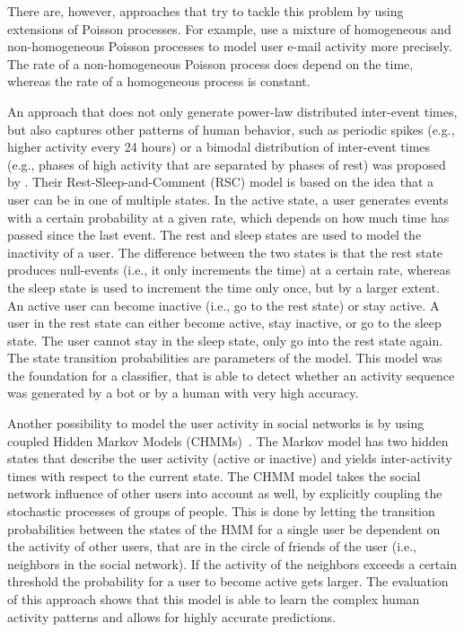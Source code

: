 There are, however, approaches that try to tackle this problem by using extensions of Poisson processes.
For example, \citet{Malmgren2008} use a mixture of homogeneous and non-homogeneous Poisson processes to model user e-mail activity more precisely.
The rate of a non-homogeneous Poisson process does depend on the time, whereas the rate of a homogeneous process is constant.

An approach that does not only generate power-law distributed inter-event times, but also captures other patterns of human behavior, such as periodic spikes (e.g., higher activity every 24 hours) or a bimodal distribution of inter-event times (e.g., phases of high activity that are separated by phases of rest) was proposed by \citet{Costa2015}.
Their Rest-Sleep-and-Comment (RSC) model is based on the idea that a user can be in one of multiple states.
In the active state, a user generates events with a certain probability at a given rate, which depends on how much time has passed since the last event.
The rest and sleep states are used to model the inactivity of a user.
The difference between the two states is that the rest state produces null-events (i.e., it only increments the time) at a certain rate, whereas the sleep state is used to increment the time only once, but by a larger extent.
An active user can become inactive (i.e., go to the rest state) or stay active.
A user in the rest state can either become active, stay inactive, or go to the sleep state.
The user cannot stay in the sleep state, only go into the rest state again.
The state transition probabilities are parameters of the model.
This model was the foundation for a classifier, that is able to detect whether an activity sequence was generated by a bot or by a human with very high accuracy.

Another possibility to model the user activity in social networks is by using coupled Hidden Markov Models (CHMMs)~\cite{Raghavan2013}.
The Markov model has two hidden states that describe the user activity (active or inactive) and yields inter-activity times with respect to the current state.
The CHMM model takes the social network influence of other users into account as well, by explicitly coupling the stochastic processes of groups of people.
This is done by letting the transition probabilities between the states of the HMM for a single user be dependent on the activity of other users, that are in the circle of friends of the user (i.e., neighbors in the social network).
If the activity of the neighbors exceeds a certain threshold the probability for a user to become active gets larger.
The evaluation of this approach shows that this model is able to learn the complex human activity patterns and allows for highly accurate predictions.


